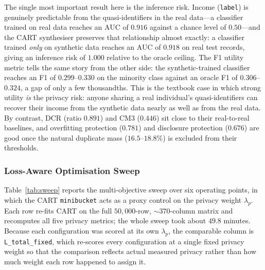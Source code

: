 \documentclass[11pt]{article}
\begin{document}
The single most important result here is the inference risk. Income (\texttt{label}) is genuinely predictable from the quasi-identifiers in the real data---a classifier trained on real data reaches an AUC of $0.916$ against a chance level of $0.50$---and the CART synthesiser preserves that relationship almost exactly: a classifier trained \emph{only} on synthetic data reaches an AUC of $0.918$ on real test records, giving an inference risk of $1.000$ relative to the oracle ceiling. The F1 utility metric tells the same story from the other side: the synthetic-trained classifier reaches an F1 of $0.299$--$0.330$ on the minority class against an oracle F1 of $0.306$--$0.324$, a gap of only a few thousandths. This is the textbook case in which strong utility \emph{is} the privacy risk: anyone sharing a real individual's quasi-identifiers can recover their income from the synthetic data nearly as well as from the real data. By contrast, DCR (ratio $0.891$) and CM3 ($0.446$) sit close to their real-to-real baselines, and overfitting protection ($0.781$) and disclosure protection ($0.676$) are good once the natural duplicate mass ($16.5$--$18.8\%$) is excluded from their thresholds.

\subsubsection{Loss-Aware Optimisation Sweep}

Table~\ref{tab:sweep} reports the multi-objective sweep over six operating points, in which the CART \texttt{minibucket} acts as a proxy control on the privacy weight $\lambda_p$. Each row re-fits CART on the full $50{,}000$-row, $\sim$$370$-column matrix and recomputes all five privacy metrics; the whole sweep took about $49.8$ minutes. Because each configuration was scored at its own $\lambda_p$, the comparable column is \texttt{L\_total\_fixed}, which re-scores every configuration at a single fixed privacy weight so that the comparison reflects actual measured privacy rather than how much weight each row happened to assign it.
\end{document}
